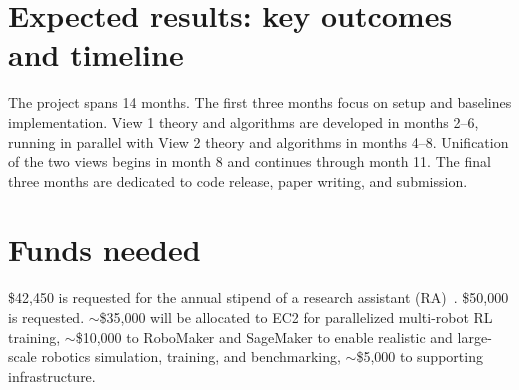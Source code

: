\documentclass[11pt]{article}
\begin{document}



\section{Expected results: key outcomes and timeline}
The project spans 14 months. The first three months focus on setup and baselines implementation. View 1 theory and algorithms are developed in months 2–6, running in parallel with View 2 theory and algorithms in months 4–8. Unification of the two views begins in month 8 and continues through month 11. The final three months are dedicated to code release, paper writing, and submission.

\section{Funds needed}
 \$42,450 is requested for the annual stipend of a research assistant (RA)~\citep{wpi_stipend_rates}.
\$50,000 is requested.
$\sim$\$35,000 will be allocated to EC2 for parallelized multi-robot RL training,
$\sim$\$10,000 to RoboMaker and SageMaker to enable realistic and large-scale robotics simulation, training, and benchmarking,
$\sim$\$5,000 to supporting infrastructure.




\end{document}
